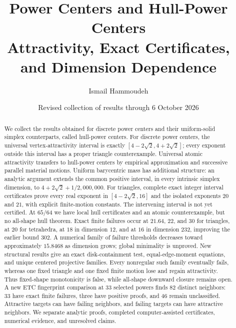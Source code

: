 \documentclass[11pt]{article}
\title{\textbf{Power Centers and Hull-Power Centers}\\[5pt]
\large Attractivity, Exact Certificates, and Dimension Dependence}
\author{Ismail Hammoudeh}
\date{Revised collection of results through 6 October 2026}
\theoremstyle{definition}
\begin{document}
\maketitle
\begin{abstract}
We collect the results obtained for discrete power centers and their
uniform-solid simplex counterparts, called hull-power centers. For discrete
power centers, the universal vertex-attractivity interval is exactly
$[4-2\sqrt2,4+2\sqrt2]$; every exponent outside this interval has a proper
triangle counterexample. Universal atomic attractivity transfers to hull-power
centers by empirical approximation and successive parallel material motions.
Uniform barycentric mass has additional structure: an analytic argument
extends the common positive interval, in every intrinsic simplex dimension,
to $4+2\sqrt2+1/2{,}000{,}000$. For triangles, complete exact integer interval
certificates prove every real exponent in $[4-2\sqrt2,16]$ and the isolated
exponents $20$ and $21$, with explicit finite-motion constants. The
intervening interval is not yet certified. At $65/64$ we have local hull
certificates and an atomic counterexample, but no all-shape hull theorem.
Exact finite failures occur at $21.64$, $22$, and $30$ for triangles, at
$20$ for tetrahedra, at $18$ in dimension $12$, and at $16$ in dimension
$232$, improving the earlier bound $302$. A numerical family of failure
thresholds decreases toward approximately $15.8468$ as dimension grows;
global minimality is unproved. New structural results give an exact
disk-containment test, equal-edge-moment equations, and unique centered
projective families. Every nonregular such family eventually fails,
whereas one fixed triangle and one fixed finite motion lose and regain
attractivity. Thus fixed-shape monotonicity is false, while all-shape
downward closure remains open. A new ETC fingerprint comparison at 33
selected powers finds 82 distinct neighbors: 33 have exact finite failures,
three have positive proofs, and 46 remain unclassified. Attractive targets
can have failing neighbors, and failing targets can have attractive neighbors.
We separate analytic proofs, completed
computer-assisted certificates, numerical evidence, and unresolved claims.
\end{abstract}
\end{document}
